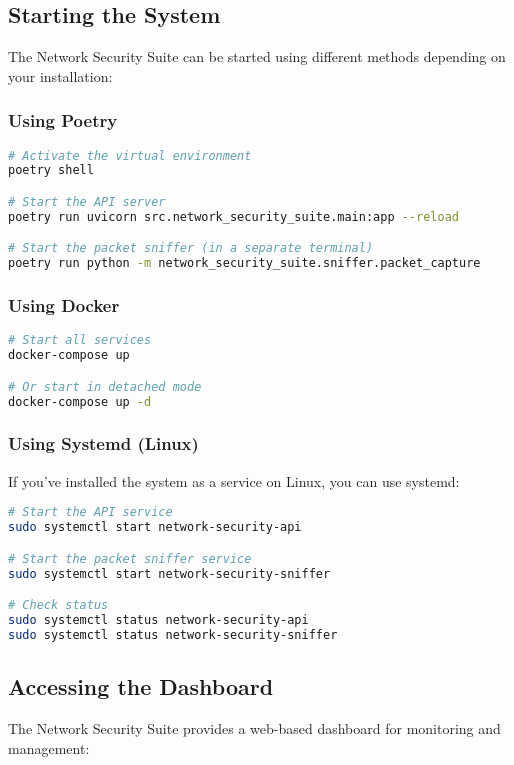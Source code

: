 \subsection{Starting the System}
The Network Security Suite can be started using different methods depending on your installation:

\subsubsection{Using Poetry}
\begin{lstlisting}[language=bash, caption=Starting with Poetry]
# Activate the virtual environment
poetry shell

# Start the API server
poetry run uvicorn src.network_security_suite.main:app --reload

# Start the packet sniffer (in a separate terminal)
poetry run python -m network_security_suite.sniffer.packet_capture
\end{lstlisting}

\subsubsection{Using Docker}
\begin{lstlisting}[language=bash, caption=Starting with Docker]
# Start all services
docker-compose up

# Or start in detached mode
docker-compose up -d
\end{lstlisting}

\subsubsection{Using Systemd (Linux)}
If you've installed the system as a service on Linux, you can use systemd:

\begin{lstlisting}[language=bash, caption=Starting with Systemd]
# Start the API service
sudo systemctl start network-security-api

# Start the packet sniffer service
sudo systemctl start network-security-sniffer

# Check status
sudo systemctl status network-security-api
sudo systemctl status network-security-sniffer
\end{lstlisting}

\subsection{Accessing the Dashboard}
The Network Security Suite provides a web-based dashboard for monitoring and management:

